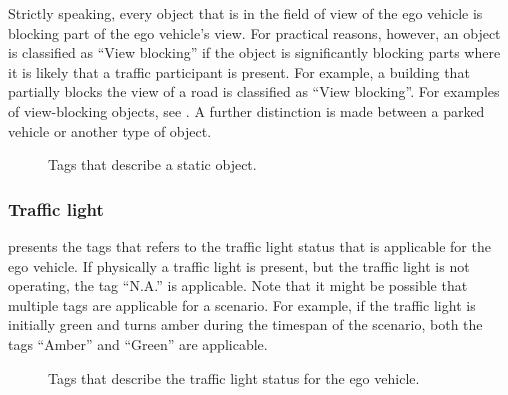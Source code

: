 Strictly speaking, every object that is in the field of view of the ego vehicle is blocking part of the ego vehicle's view. For practical reasons, however, an object is classified as ``View blocking'' if the object is significantly blocking parts where it is likely that a traffic participant is present. For example, a building that partially blocks the view of a road is classified as ``View blocking''. For examples of view-blocking objects, see \cite{CATS2015}. A further distinction is made between a parked vehicle or another type of object.

\begin{figure}
	\centering
	\caption{Tags that describe a static object.}
	\label{fig:tree static object}
\end{figure}

%

\subsubsection{Traffic light}
 presents the tags that refers to the traffic light status that is applicable for the ego vehicle. If physically a traffic light is present, but the traffic light is not operating, the tag ``N.A.'' is applicable. Note that it might be possible that multiple tags are applicable for a scenario. For example, if the traffic light is initially green and turns amber during the timespan of the scenario, both the tags ``Amber'' and ``Green'' are applicable.

\begin{figure}
	\centering
	\caption{Tags that describe the traffic light status for the ego vehicle.}
	\label{fig:tree traffic light}
\end{figure}



